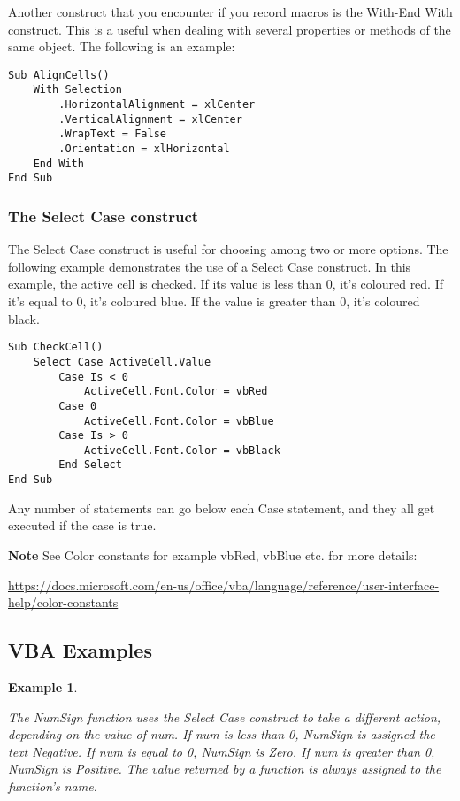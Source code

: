 \documentclass[
]{article}
\theoremstyle{definition}
\theoremstyle{definition}
\newtheorem{example}{Example}[section]
\theoremstyle{definition}
\theoremstyle{definition}
\theoremstyle{remark}
\begin{document}
Another construct that you encounter if you record macros is the With-End With construct. This is a useful when dealing with several
properties or methods of the same object. The following is an example:

\begin{verbatim}
Sub AlignCells()
    With Selection
        .HorizontalAlignment = xlCenter
        .VerticalAlignment = xlCenter
        .WrapText = False
        .Orientation = xlHorizontal
    End With
End Sub
\end{verbatim}

\hypertarget{the-select-case-construct}{%
\subsubsection{The Select Case construct}\label{the-select-case-construct}}

The Select Case construct is useful for choosing among two or more options. The following example demonstrates the use of a Select Case construct. In this example, the active cell is checked. If its value is
less than 0, it's coloured red. If it's equal to 0, it's coloured blue. If the value is greater than 0, it's coloured black.

\begin{verbatim}
Sub CheckCell()
    Select Case ActiveCell.Value
        Case Is < 0
            ActiveCell.Font.Color = vbRed
        Case 0
            ActiveCell.Font.Color = vbBlue
        Case Is > 0
            ActiveCell.Font.Color = vbBlack
        End Select
End Sub
\end{verbatim}

Any number of statements can go below each Case statement, and they all
get executed if the case is true.

\textbf{Note} See Color constants for example vbRed, vbBlue etc. for more
details:

\url{https://docs.microsoft.com/en-us/office/vba/language/reference/user-interface-help/color-constants}

\hypertarget{vba-examples}{%
\subsection{VBA Examples}\label{vba-examples}}

\begin{example}
\protect\hypertarget{exm:unlabeled-div-27}{}\label{exm:unlabeled-div-27}

\emph{The NumSign function uses the Select Case construct to
take a different action, depending on the value of num. If num is less
than 0, NumSign is assigned the text Negative. If num is equal to 0,
NumSign is Zero. If num is greater than 0, NumSign is Positive. The
value returned by a function is always assigned to the function's name.}

\end{example}
\end{document}

